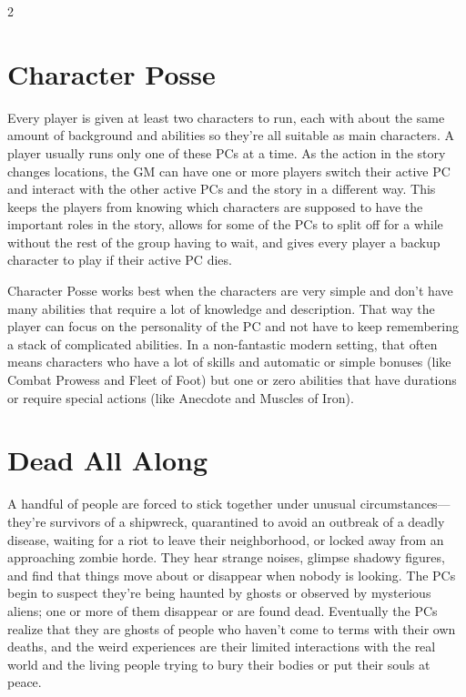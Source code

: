 \begin{multicols}{2}
\section{Character Posse}

Every player is given at least two characters to run, each with about the same amount of background and abilities so they’re all suitable as main characters. A player usually runs only one of these PCs at a time. As the action in the story changes locations, the GM can have one or more players switch their active PC and interact with the other active PCs and the story in a different way. This keeps the players from knowing which characters are supposed to have the important roles in the story, allows for some of the PCs to split off for a while without the rest of the group having to wait, and gives every player a backup character to play if their active PC dies.

Character Posse works best when the characters are very simple and don’t have many abilities that require a lot of knowledge and description. That way the player can focus on the personality of the PC and not have to keep remembering a stack of complicated abilities. In a non-fantastic modern setting, that often means characters who have a lot of skills and automatic or simple bonuses (like Combat Prowess and Fleet of Foot) but one or zero abilities that have durations or require special actions (like Anecdote and Muscles of Iron).

\section{Dead All Along}

A handful of people are forced to stick together under unusual circumstances—they’re survivors of a shipwreck, quarantined to avoid an outbreak of a deadly disease, waiting for a riot to leave their neighborhood, or locked away from an approaching zombie horde. They hear strange noises, glimpse shadowy figures, and find that things move about or disappear when nobody is looking. The PCs begin to suspect they’re being haunted by ghosts or observed by mysterious aliens; one or more of them disappear or are found dead. Eventually the PCs realize that they are ghosts of people who haven’t come to terms with their own deaths, and the weird experiences are their limited interactions with the real world and the living people trying to bury their bodies or put their souls at peace.


\end{multicols}
